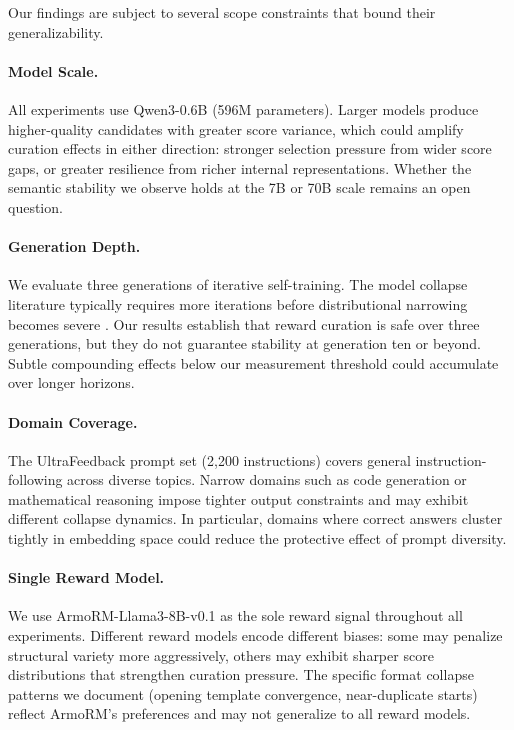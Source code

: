 
Our findings are subject to several scope constraints that bound their generalizability.

\paragraph{Model Scale.}
All experiments use Qwen3-0.6B (596M parameters). Larger models produce higher-quality candidates with greater score variance, which could amplify curation effects in either direction: stronger selection pressure from wider score gaps, or greater resilience from richer internal representations. Whether the semantic stability we observe holds at the 7B or 70B scale remains an open question.

\paragraph{Generation Depth.}
We evaluate three generations of iterative self-training. The model collapse literature typically requires more iterations before distributional narrowing becomes severe \cite{placeholder_shumailov}. Our results establish that reward curation is safe over three generations, but they do not guarantee stability at generation ten or beyond. Subtle compounding effects below our measurement threshold could accumulate over longer horizons.

\paragraph{Domain Coverage.}
The UltraFeedback prompt set (2,200 instructions) covers general instruction-following across diverse topics. Narrow domains such as code generation or mathematical reasoning impose tighter output constraints and may exhibit different collapse dynamics. In particular, domains where correct answers cluster tightly in embedding space could reduce the protective effect of prompt diversity.

\paragraph{Single Reward Model.}
We use ArmoRM-Llama3-8B-v0.1 as the sole reward signal throughout all experiments. Different reward models encode different biases: some may penalize structural variety more aggressively, others may exhibit sharper score distributions that strengthen curation pressure. The specific format collapse patterns we document (opening template convergence, near-duplicate starts) reflect ArmoRM's preferences and may not generalize to all reward models.

